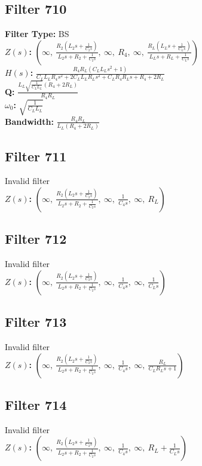 \documentclass{article}
\begin{document}
\subsection*{Filter 710}
\textbf{Filter Type:} BS \\ 
\textbf{$Z(s)$:} $\left( \infty, \  \frac{R_{2} \left(L_{2} s + \frac{1}{C_{2} s}\right)}{L_{2} s + R_{2} + \frac{1}{C_{2} s}}, \  \infty, \  R_{4}, \  \infty, \  \frac{R_{L} \left(L_{L} s + \frac{1}{C_{L} s}\right)}{L_{L} s + R_{L} + \frac{1}{C_{L} s}}\right)$ \\ 
\textbf{$H(s)$:} $\frac{R_{4} R_{L} \left(C_{L} L_{L} s^{2} + 1\right)}{C_{L} L_{L} R_{4} s^{2} + 2 C_{L} L_{L} R_{L} s^{2} + C_{L} R_{4} R_{L} s + R_{4} + 2 R_{L}}$ \\ 
\textbf{Q:} $\frac{L_{L} \sqrt{\frac{1}{C_{L} L_{L}}} \left(R_{4} + 2 R_{L}\right)}{R_{4} R_{L}}$ \\ 
\textbf{$\omega_0$:} $\sqrt{\frac{1}{C_{L} L_{L}}}$ \\ 
\textbf{Bandwidth:} $\frac{R_{4} R_{L}}{L_{L} \left(R_{4} + 2 R_{L}\right)}$ \\ 
\subsection*{Filter 711}
Invalid filter \\ 
\textbf{$Z(s)$:} $\left( \infty, \  \frac{R_{2} \left(L_{2} s + \frac{1}{C_{2} s}\right)}{L_{2} s + R_{2} + \frac{1}{C_{2} s}}, \  \infty, \  \frac{1}{C_{4} s}, \  \infty, \  R_{L}\right)$ \\ 
\subsection*{Filter 712}
Invalid filter \\ 
\textbf{$Z(s)$:} $\left( \infty, \  \frac{R_{2} \left(L_{2} s + \frac{1}{C_{2} s}\right)}{L_{2} s + R_{2} + \frac{1}{C_{2} s}}, \  \infty, \  \frac{1}{C_{4} s}, \  \infty, \  \frac{1}{C_{L} s}\right)$ \\ 
\subsection*{Filter 713}
Invalid filter \\ 
\textbf{$Z(s)$:} $\left( \infty, \  \frac{R_{2} \left(L_{2} s + \frac{1}{C_{2} s}\right)}{L_{2} s + R_{2} + \frac{1}{C_{2} s}}, \  \infty, \  \frac{1}{C_{4} s}, \  \infty, \  \frac{R_{L}}{C_{L} R_{L} s + 1}\right)$ \\ 
\subsection*{Filter 714}
Invalid filter \\ 
\textbf{$Z(s)$:} $\left( \infty, \  \frac{R_{2} \left(L_{2} s + \frac{1}{C_{2} s}\right)}{L_{2} s + R_{2} + \frac{1}{C_{2} s}}, \  \infty, \  \frac{1}{C_{4} s}, \  \infty, \  R_{L} + \frac{1}{C_{L} s}\right)$ \\ 
\end{document}
